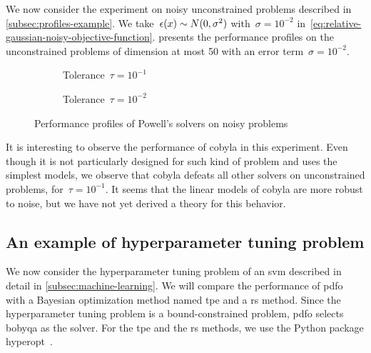 We now consider the experiment on noisy unconstrained problems described in \cref{subsec:profiles-example}.
We take~$\epsilon(\iter) \sim N(0, \sigma^2)$ with~$\sigma = 10^{-2}$ in~\cref{eq:relative-gaussian-noisy-objective-function}.
 presents the performance profiles on the unconstrained problems of dimension at most \num{50} with an error term~$\sigma = 10^{-2}$.

\begin{figure}[ht]
    \centering
    \begin{subfigure}[b]{0.49\textwidth}
        \centering
        \caption{Tolerance~$\tau = 10^{-1}$}
    \end{subfigure}
    \hfill
    \begin{subfigure}[b]{0.49\textwidth}
        \centering
        \caption{Tolerance~$\tau = 10^{-2}$}
    \end{subfigure}
    \caption{Performance profiles of Powell's  solvers on noisy problems}
    \label{fig:ppun-50}
\end{figure}

It is interesting to observe the performance of \gls{cobyla} in this experiment.
Even though it is not particularly designed for such kind of problem and uses the simplest models, we observe that \gls{cobyla} defeats all other solvers on unconstrained problems, for~$\tau = 10^{-1}$.
It seems that the linear models of \gls{cobyla} are more robust to noise, but we have not yet derived a theory for this behavior.

\subsection{An example of hyperparameter tuning problem}

We now consider the hyperparameter tuning problem of an \gls{svm} described in detail in \cref{subsec:machine-learning}.
We will compare the performance of \gls{pdfo} with a Bayesian optimization method named \gls{tpe} and a \gls{rs} method.
Since the hyperparameter tuning problem is a bound-constrained problem, \gls{pdfo} selects \gls{bobyqa} as the solver.
For the \gls{tpe} and the \gls{rs} methods, we use the Python package hyperopt~\cite{Bergstra_Yamins_Cox_2013}.

